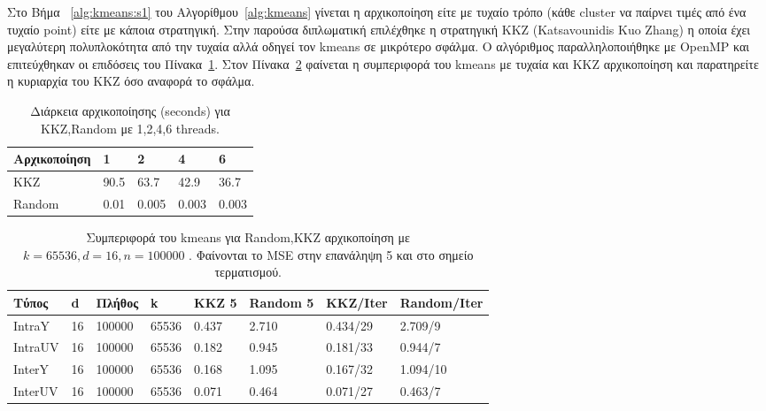 \newpage

\indent Στο Βήμα ~\ref{alg:kmeans:s1} του Αλγορίθμου~\ref{alg:kmeans} γίνεται η αρχικοποίηση είτε με τυχαίο τρόπο
(κάθε cluster να παίρνει τιμές από ένα τυχαίο point) είτε με κάποια στρατηγική. Στην παρούσα διπλωματική επιλέχθηκε
η στρατηγική KKZ (Katsavounidis Kuo Zhang) η οποία έχει μεγαλύτερη πολυπλοκότητα από την τυχαία αλλά οδηγεί τον kmeans
σε μικρότερο σφάλμα. Ο αλγόριθμος παραλληλοποιήθηκε με OpenMP και επιτεύχθηκαν οι επιδόσεις του Πίνακα~\ref{table:kkzspeed}.
Στον Πίνακα~\ref{table:kkziter} φαίνεται η συμπεριφορά του kmeans με τυχαία και KKZ αρχικοποίηση και παρατηρείτε η κυριαρχία
του KKZ όσο αναφορά το σφάλμα. 

\begin{table}[h!]
    \begin{center}
        \begin{tabular}{| l | l | l | l | l |}
        \hline
        Αρχικοποίηση   & 1     & 2      & 4     & 6    \\ \hline
        KKZ     & 90.5 & 63.7   & 42.9  & 36.7  \\ \hline
        Random  & 0.01  & 0.005  & 0.003 & 0.003    \\ \hline
        \hline
        \end{tabular}
    \end{center}
    \caption{Διάρκεια αρχικοποίησης (seconds) για KKZ,Random με 1,2,4,6 threads.}
    \label{table:kkzspeed}
\end{table}

\begin{table}[h!]
    \begin{center}
        \begin{tabular}{| l | l | l | l | l | l | l | l |}
        \hline
        Τύπος    & d  & Πλήθος & k     & KKZ 5  & Random 5 & KKZ/Iter   & Random/Iter   \\ \hline
        IntraY   & 16 & 100000 & 65536 & 0.437  & 2.710    &  0.434/29  & 2.709/9                 \\ \hline
        IntraUV  & 16 & 100000 & 65536 & 0.182  & 0.945    &  0.181/33  & 0.944/7                 \\ \hline
        InterY   & 16 & 100000 & 65536 & 0.168  & 1.095    &  0.167/32  & 1.094/10                \\ \hline
        InterUV  & 16 & 100000 & 65536 & 0.071  & 0.464    &  0.071/27  & 0.463/7                 \\ \hline
        \hline
        \end{tabular}
    \end{center}
    \caption{Συμπεριφορά του kmeans για Random,KKZ αρχικοποίηση με $k=65536,d=16,n=100000$
    . Φαίνονται το MSE στην επανάληψη 5 και στο σημείο τερματισμού.}
    \label{table:kkziter}
\end{table}

